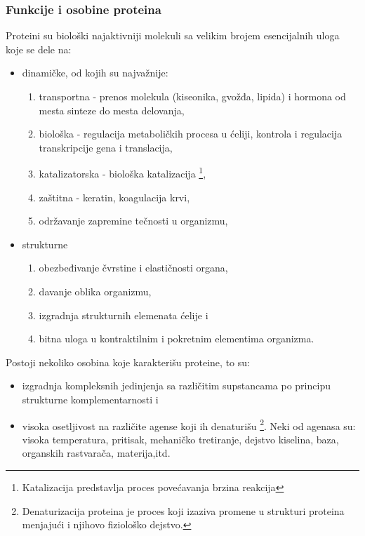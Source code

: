 \documentclass[a4paper]{article}
\begin{document}
\subsubsection{Funkcije i osobine proteina}
Proteini su biološki najaktivniji molekuli sa velikim brojem esencijalnih uloga koje se dele na:
\begin{itemize}
\item dinamičke, od kojih su najvažnije:
\begin{enumerate} 
\item transportna - prenos molekula (kiseonika, gvožđa, lipida) i hormona od mesta sinteze do mesta delovanja,
\item biološka - regulacija metaboličkih procesa u ćeliji, kontrola i regulacija transkripcije gena i translacija,
\item katalizatorska - biološka katalizacija \footnote{Katalizacija predstavlja proces povećavanja brzina reakcija},
\item zaštitna - keratin, koagulacija krvi,
\item održavanje zapremine tečnosti u organizmu,
\end{enumerate}
\item strukturne
\begin{enumerate}
\item obezbeđivanje čvrstine i elastičnosti organa,
\item davanje oblika organizmu,
\item izgradnja strukturnih elemenata ćelije i
\item bitna uloga u kontraktilnim i pokretnim elementima organizma.
\end{enumerate}
\end{itemize} 

Postoji nekoliko osobina koje karakterišu proteine, to su:
\begin{itemize}
\item izgradnja kompleksnih jedinjenja sa različitim supstancama po principu strukturne komplementarnosti i  
\item visoka osetljivost na različite agense koji ih denaturišu \footnote{Denaturizacija proteina je proces koji izaziva promene u strukturi proteina menjajući i njihovo fiziološko dejstvo.}. Neki od agenasa su: visoka temperatura, pritisak, mehaničko tretiranje, dejstvo kiselina, baza, organskih rastvarača, materija,itd.~\cite{spasic}
\end{itemize}
 
\end{document}
